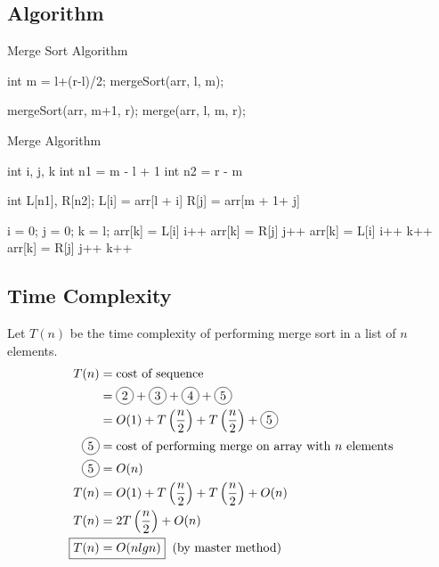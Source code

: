 \documentclass[12pt]{article}%
\newcommand*\circled[1]{\tikz[baseline=(char.base)]{
            \node[shape=circle,draw,inner sep=2pt] (char) {#1};}}
\begin{document}
  \subsection{Algorithm \cite{gfg_merge_sort}}
  \begin{algorithm}
			\caption{Merge Sort Algorithm}\label{merge-sort}
			\begin{algorithmic}[1]
				\State int m = l+(r-l)/2; 
        \State mergeSort(arr, l, m); 
        
        \State mergeSort(arr, m+1, r); 
        \State merge(arr, l, m, r);
			\EndFunction
			\end{algorithmic}
  \end{algorithm}
  
  \begin{algorithm}[H]
			\caption{Merge Algorithm}\label{merge}
			\begin{algorithmic}[1]
        \State int i, j, k
        \State int n1 = m - l + 1
        \State int n2 =  r - m
  
        \State int L[n1], R[n2]; 
          \State L[i] = arr[l + i]
        \EndFor
          \State R[j] = arr[m + 1+ j]
        \EndFor
  
        \State i = 0;
        \State j = 0;
        \State k = l;
            \State arr[k] = L[i]
            \State i++
          \Else 
           \State arr[k] = R[j]
            \State j++
          \EndIf 
        \EndWhile
          \State arr[k] = L[i]
          \State i++
          \State k++
        \EndWhile
          \State arr[k] = R[j]
          \State j++ 
          \State k++ 
        \EndWhile
			\EndFunction
			\end{algorithmic}
	\end{algorithm}
  \subsection{Time Complexity}
    Let $T(n)$ be the time complexity of performing merge sort in a list of $n$ elements.
      \begin{align*}
        T(n) &= \text{cost of sequence} \\
        &= \circled{2} + \circled{3} + \circled{4} + \circled{5} \\
        &= O(1) + T\left(\frac{n}{2}\right) + T\left(\frac{n}{2}\right) + \circled{5} \\
        \circled{5} &= \text{cost of performing merge on array with $n$ elements} \\
        \circled{5} &= O(n) \\
        T(n) &= O(1) + T\left(\frac{n}{2}\right) + T\left(\frac{n}{2}\right) + O(n) \\
        T(n) &= 2 T\left(\frac{n}{2}\right) + O(n) \\
        \Aboxed{T(n) &= O(nlgn)} \text{\hspace{2mm}(by master method)}
      \end{align*}
\end{document}
